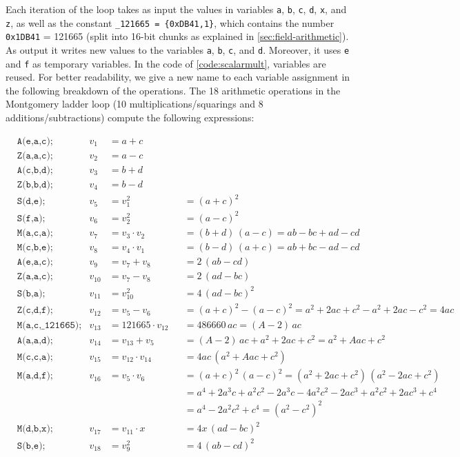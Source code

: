 \documentclass{article}
\begin{document}
Each iteration of the loop takes as input the values in variables \verb|a|, \verb|b|, \verb|c|, \verb|d|, \verb|x|, and \verb|z|, as well as the constant \verb|_121665 = {0xDB41,1}|, which contains the number \verb|0x1DB41| = 121665 (split into 16-bit chunks as explained in \autoref{sec:field-arithmetic}).
As output it writes new values to the variables \verb|a|, \verb|b|, \verb|c|, and \verb|d|.
Moreover, it uses \verb|e| and \verb|f| as temporary variables.
In the code of \autoref{code:scalarmult}, variables are reused.
For better readability, we give a new name to each variable assignment in the following breakdown of the operations.
The 18 arithmetic operations in the Montgomery ladder loop (10 multiplications/squarings and 8 additions/subtractions) compute the following expressions:

\begin{align*}
    & \texttt{A(e,a,c);} & v_1    &= a + c \\
    & \texttt{Z(a,a,c);} & v_2    &= a - c \\
    & \texttt{A(c,b,d);} & v_3    &= b + d \\
    & \texttt{Z(b,b,d);} & v_4    &= b - d \\
    & \texttt{S(d,e);}   & v_5    &= v_1^2          &&= (a + c)^2 \\
    & \texttt{S(f,a);}   & v_6    &= v_2^2          &&= (a - c)^2 \\
    & \texttt{M(a,c,a);} & v_7    &= v_3 \cdot v_2  &&= (b + d)\,(a - c) = ab - bc + ad - cd \\
    & \texttt{M(c,b,e);} & v_8    &= v_4 \cdot v_1  &&= (b - d)\,(a + c) = ab + bc - ad - cd \\
    & \texttt{A(e,a,c);} & v_9    &= v_7 + v_8      &&= 2\,(ab - cd) \\
    & \texttt{Z(a,a,c);} & v_{10} &= v_7 - v_8      &&= 2\,(ad - bc) \\
    & \texttt{S(b,a);}   & v_{11} &= v_{10}^2       &&= 4\,(ad - bc)^2 \\
    & \texttt{Z(c,d,f);} & v_{12} &= v_5 - v_6      &&= (a + c)^2 - (a - c)^2 = a^2 + 2ac + c^2 - a^2 + 2ac - c^2 = 4ac \\
    & \texttt{M(a,c,{\char`_}121665);} & v_{13} &= 121665 \cdot v_{12} &&= 486660\, ac = (A - 2)\,ac \\
    & \texttt{A(a,a,d);} & v_{14} &= v_{13} + v_5   &&= (A - 2)\,ac + a^2 + 2ac + c^2 = a^2 + Aac + c^2 \\
    & \texttt{M(c,c,a);} & v_{15} &= v_{12} \cdot v_{14} &&= 4ac\, (a^2 + Aac + c^2) \\
    & \texttt{M(a,d,f);} & v_{16} &= v_5 \cdot v_6  &&= (a + c)^2\,(a - c)^2 = (a^2 + 2ac + c^2)\,(a^2 - 2ac + c^2) \\
    &                    &        &                 &&= a^4 + 2a^3 c + a^2 c^2 - 2a^3 c - 4 a^2 c^2 - 2a c^3 + a^2 c^2 + 2a c^3 + c^4 \\
    &                    &        &                 &&= a^4 - 2a^2 c^2 + c^4 = (a^2 - c^2)^2 \\
    & \texttt{M(d,b,x);} & v_{17} &= v_{11} \cdot x &&= 4x\,(ad - bc)^2 \\
    & \texttt{S(b,e);}   & v_{18} &= v_9^2          &&= 4\,(ab - cd)^2
\end{align*}
\end{document}

